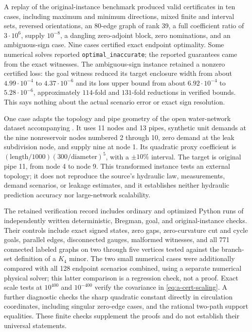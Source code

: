 A replay of the original-instance benchmark produced valid certificates
in ten cases, including maximum and minimum directions, mixed finite
and interval sets, reversed orientations, an 80-edge graph of rank
39, a full coefficient ratio of $3\cdot10^6$, supply $10^{-8}$, a dangling
zero-adjoint block, zero nominations, and an ambiguous-sign case.
Nine cases certified exact endpoint optimality. Some numerical solves
reported \texttt{optimal\_inaccurate}; the reported guarantees came
from the exact witnesses. The ambiguous-sign instance retained a
nonzero certified loss: the goal witness reduced its target enclosure
width from about $4.99\cdot10^{-4}$ to $4.37\cdot10^{-6}$
and its loss upper bound from about $6.92\cdot10^{-4}$ to
$5.28\cdot10^{-6}$, approximately $114$-fold and $131$-fold reductions
in verified bounds. This says nothing about the actual scenario error
or exact sign resolution.

One case adapts the topology and pipe geometry of the open water-network
dataset accompanying \citet{vrachimis2018-hydraulic}.
It uses 11 nodes and 13 pipes, synthetic unit demands at the nine
nonreservoir nodes numbered 2 through 10, zero demand at the leak
subdivision node, and supply nine at node 1. Its quadratic proxy
coefficient is $(\mathrm{length}/1000)(300/\mathrm{diameter})^5$,
with a $\pm10\%$ interval. The target is original pipe 11,
from node 4 to node 9. This transformed instance tests an external
topology; it does not reproduce the source's hydraulic law,
measurements, demand scenarios, or leakage estimates, and it
establishes neither hydraulic prediction accuracy nor large-network
scalability.

The retained verification record includes ordinary and optimized
Python runs of independently written deterministic, Bregman, goal,
and original-instance checks. Their controls include exact signed
states, zero gaps, zero-curvature cut and cycle goals, parallel edges,
disconnected gauges, malformed witnesses, and all 771 connected
labeled graphs on two through five vertices tested against the
branch-set definition of a $K_4$ minor. The two small numerical cases
were additionally compared with all 128 endpoint scenarios combined,
using a separate numerical physical solver; this latter comparison is
a regression check, not a proof. Exact scale tests at $10^{400}$
and $10^{-400}$ verify the covariance in
\eqref{eq:a-cert-scaling}. A further diagnostic checks the sharp
quadratic constant directly in circulation coordinates, including
singular zero-edge cases, and the rational two-path support equalities.
These finite checks supplement the proofs and do not establish their
universal statements.


